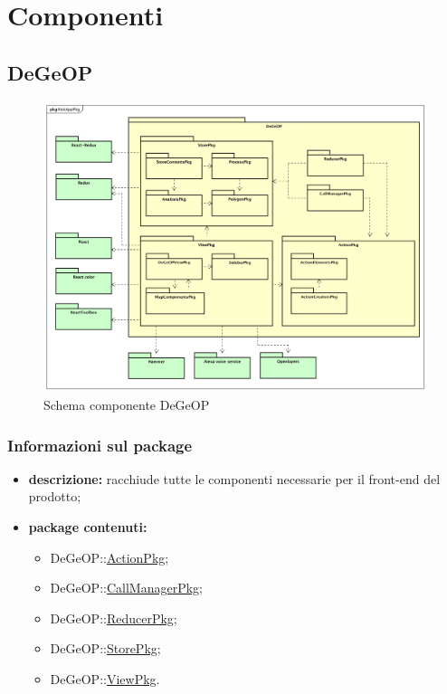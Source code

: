\section{Componenti} \label{componenti}
\subsection{DeGeOP}
\label{pkg::DeGeOP}
\begin{figure}[H]
	\centering
	\includegraphics[width=\textwidth]{img/PkgDiagram/DeGeOPPkg.png}
	\caption{Schema componente DeGeOP}
\end{figure}
\subsubsection{Informazioni sul package}
\begin{itemize}
	\item \textbf{descrizione:} racchiude tutte le componenti necessarie per il front-end del prodotto;
	\item \textbf{package contenuti:}
	\begin{itemize}
		\item DeGeOP::\hyperref[pkg::ActionPkg]{ActionPkg};
		\item DeGeOP::\hyperref[pkg::CallManagerPkg]{CallManagerPkg};
		\item DeGeOP::\hyperref[pkg::ReducerPkg]{ReducerPkg};
		\item DeGeOP::\hyperref[pkg::StorePkg]{StorePkg};
		\item DeGeOP::\hyperref[pkg::ViewPkg]{ViewPkg}.
	\end{itemize}
\end{itemize}
\newpage

